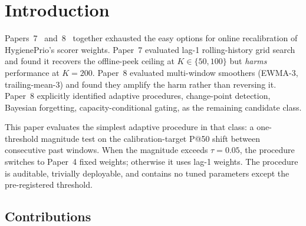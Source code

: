\section{Introduction}

Papers~7~\cite{paper7online} and~8~\cite{paper8multi} together
exhausted the easy options for online recalibration of HygienePrio's
scorer weights. Paper~7 evaluated lag-1 rolling-history grid search
and found it recovers the offline-peek ceiling at $K \in \{50, 100\}$
but \textit{harms} performance at $K = 200$. Paper~8 evaluated
multi-window smoothers (EWMA-3, trailing-mean-3) and found they
amplify the harm rather than reversing it. Paper~8 explicitly
identified adaptive procedures, change-point detection, Bayesian
forgetting, capacity-conditional gating, as the remaining
candidate class.

This paper evaluates the simplest adaptive procedure in that class:
a one-threshold magnitude test on the calibration-target P@50
shift between consecutive past windows. When the magnitude exceeds
$\tau = 0.05$, the procedure switches to Paper~4 fixed weights;
otherwise it uses lag-1 weights. The procedure is auditable,
trivially deployable, and contains no tuned parameters except the
pre-registered threshold.

\subsection{Contributions}

